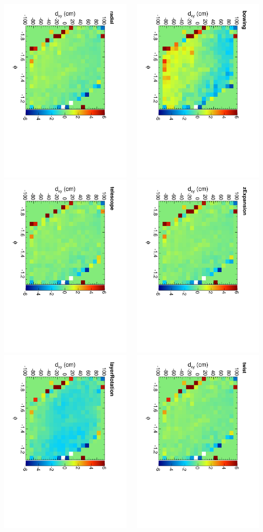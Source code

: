 \documentclass[compress]{beamer}
\begin{document}
\begin{frame}
\begin{columns}
\includegraphics[height=0.32\linewidth, angle=90]{residx-dxy-phi-low_radial.pdf}
\includegraphics[height=0.32\linewidth, angle=90]{residx-dxy-phi-low_telescope.pdf}
\includegraphics[height=0.32\linewidth, angle=90]{residx-dxy-phi-low_layerRotation.pdf}

\includegraphics[height=0.32\linewidth, angle=90]{residx-dxy-phi-low_bowing.pdf}
\includegraphics[height=0.32\linewidth, angle=90]{residx-dxy-phi-low_zExpansion.pdf}
\includegraphics[height=0.32\linewidth, angle=90]{residx-dxy-phi-low_twist.pdf}


\end{columns}
\end{frame}
\end{document}
